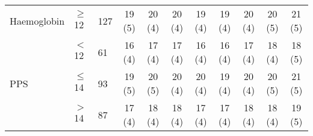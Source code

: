 \begin{sidewaystable}[p]
\begin{tabular}{|l ll | c c c c c c c c|}
		Haemoglobin         & $\geq$12  & 127   & 19 (5)    & 20 (4)    & 20 (4)    & 19 (4)    & 19 (4)    & 20 (4)    & 20 (5)    & 21 (5)    \\
		                    & $<$12     & 61    & 16 (4)    & 17 (4)    & 17 (4)    & 16 (4)    & 16 (4)    & 17 (4)    & 18 (4)    & 18 (5)    \\
		PPS                 & $\leq$14  & 93    & 19 (5)    & 20 (5)    & 20 (4)    & 20 (4)    & 19 (4)    & 20 (4)    & 20 (5)    & 21 (5)    \\
		                    & $>$14     & 87    & 17 (4)    & 18 (4)    & 18 (4)    & 17 (4)    & 17 (4)    & 18 (4)    & 18 (4)    & 19 (5)    \\ \hline
	\end{tabular}	
\end{sidewaystable}














